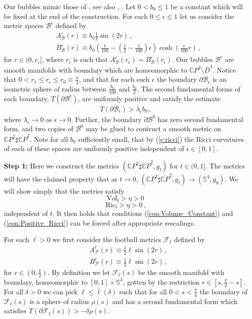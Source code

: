 \documentclass[11pt]{article}
\newcommand{\Ric}{\text{Ric}}
\newcommand{\Vol}{\text{Vol}}
\newcommand{\CC}{\mathds{C}}
\newcommand{\Sn}{\mathds{S}}
\newcommand{\cF}{\mathcal{F}}
\newcommand{\cB}{\mathcal{B}}
\begin{document}
Our bubbles mimic those of \cite{P1}, see also \cite{M1}, \cite{M3}.  Let $0<b_0\leq 1$ be a constant which will be fixed at the end of the construction.  For each $0\leq \epsilon\leq 1$ let us consider the metric spaces $\cB^\epsilon$ defined by
\begin{align}
&A^\epsilon_\cB(r) \equiv b_0\frac{1}{2}\sin(2r)\, , \\
&B^\epsilon_\cB(r) \equiv b_0\left(\frac{1}{100}-(\frac{1}{2}-\frac{1}{100})\epsilon\right)\cosh(\frac{\epsilon}{100} r)\, ,
\end{align}
for $r\in (0,r_\epsilon]$, where $r_\epsilon$ is such that $A^\epsilon_\cB(r_\epsilon)=B^\epsilon_\cB(r_\epsilon)$.  Our bubbles $\cB^\epsilon$ are smooth manifolds with boundary which are homeomorphic to $\mathds{C}P^2\setminus\overline D^4$.  Notice that $0<r_1\leq r_\epsilon\leq r_0\equiv \frac{\pi}{4}$, and that for each such $\epsilon$ the boundary $\partial\cB_\epsilon$ is an isometric sphere of radius between $\frac{b_0}{100}$ and $\frac{b_0}{2}$.  The second fundamental forms of each boundary, $T(\partial\cB^\epsilon)$, are uniformly positive and satisfy the estimate
\begin{align}\label{e:sff}
 T(\partial\cB_\epsilon)>\lambda_\epsilon b_0\, ,
\end{align}
where $\lambda_\epsilon\to 0$ as $\epsilon\to 0$.  Further, the boundary $\partial\cB^0$ has zero second fundamental form, and two copies of $\cB^0$ may be glued to contruct a smooth metric on $\CC P^2\sharp\overline{\CC P}^2$.  Note for all $b_0$ sufficiently small, that by (\ref{e:ricci}) the Ricci curvatures of each of these spaces are uniformly positive independent of $\epsilon\in [0,1]$.

\vskip3mm
{\bf Step 1:}
\vskip3mm
Here we construct the metrics $(\CC P^2\sharp\overline{\CC P}^2,g_t)$ for $t\in (0,1]$.  The metrics will have the claimed property that as $t\to 0$, $(\CC P^2\sharp\overline{\CC P}^2,g_t)\to (\Sn^4,g_0)$.  We will show simply that the metrics satisfy 
$$\Vol_t>\eta>0\, $$
$$\Ric_t>\eta>0\, ,$$ 
independent of $t$.  It then holds that conditions (\ref{con:Volume_Constant}) and (\ref{con:Positive_Ricci}) can be forced after appropriate rescalings. 

For each $\ell>0$ we first consider the football metrics $\cF_\ell$ defined by
\begin{align}
&A^\ell_\cF(r) \equiv \frac{1}{2}\ell\sin(2r)\, , \\
&B^\ell_\cF(r) \equiv \frac{1}{2}\ell\sin(2r)\, ,
\end{align}
for $r\in (0,\frac{\pi}{2})$.  By definition we let $\cF_\ell(s)$ be the smooth manifold with boundary, homeomorphic to $[0,1]\times \Sn^3$, gotten by the restriction $r\in [s,\frac{\pi}{2}-s]$.  For all $\delta>0$ we can pick $\ell\leq \bar\ell(\delta)$ such that for all $0<s< \frac{\pi}{4}$ the boundary of $\cF_\ell(s)$ is a sphere of radius $\rho(s)$ and has a second fundamental form which satisfies $T(\partial\cF_\ell(s))>-\delta\rho(s)$.
\end{document}
